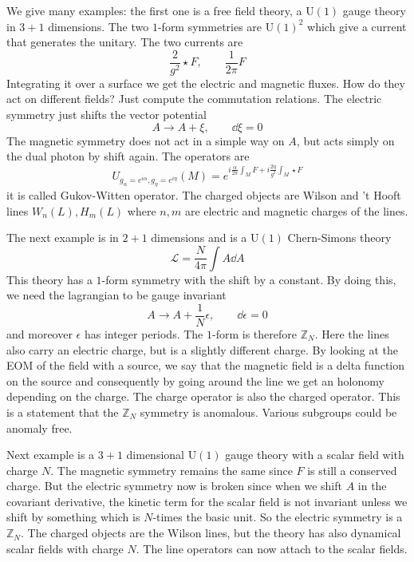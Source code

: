 \documentclass[11pt]{article}
\theoremstyle{definition}
\numberwithin{equation}{section}
\newcommand*\cL{\mathcal{L}}
\newcommand*\bbZ{\mathbb{Z}}
\newcommand*\U{\mathrm{U}}
\begin{document}
We give many examples: the first one is a free field theory, a $\U(1)$ gauge theory in $3+1$ dimensions. The two $1$-form symmetries are $\U(1)^{2}$ which give a current that generates the unitary. The two currents are 
\begin{equation}
	\frac{2}{g^{2}} \star F,\qquad \frac{1}{2\pi} F
\end{equation}
Integrating it over a surface we get the electric and magnetic fluxes. How do they act on different fields? Just compute the commutation relations. The electric symmetry just shifts the vector potential
\begin{equation}
	A\rightarrow A+\xi,\qquad \dd{\xi}=0
\end{equation}
The magnetic symmetry does not act in a simple way on $A$, but acts simply on the dual photon by shift again. The operators are
\begin{equation}
	U_{g_{\alpha}=e^{i\alpha},g_{\eta}=e^{i\eta}}(M)=e^{i\frac{\alpha}{2\pi}\int_{M}F+i\frac{2\eta}{g^{2}}\int_{M}\star F}
\end{equation}
it is called Gukov-Witten operator. The charged objects are Wilson and 't Hooft lines $W_{n}(L),H_{m}(L)$ where $n,m$ are electric and magnetic charges of the lines.

The next example is in $2+1$ dimensions and is a $\U(1)$ Chern-Simons theory
\begin{equation}
	\cL=\frac{N}{4\pi}\int A\dd{A}
\end{equation}
This theory has a $1$-form symmetry with the shift by a constant. By doing this, we need the lagrangian to be gauge invariant
\begin{equation}
	A\rightarrow A+\frac{1}{N}\epsilon,\qquad \dd{\epsilon}=0
\end{equation}
and moreover $\epsilon$ has integer periods. The $1$-form is therefore $\bbZ_{N}$. Here the lines also carry an electric charge, but is a slightly different charge. By looking at the EOM of the field with a source, we say that the magnetic field is a delta function on the source and consequently by going around the line we get an holonomy depending on the charge. The charge operator is also the charged operator. This is a statement that the $\bbZ_{N}$ symmetry is anomalous. Various subgroups could be anomaly free.

Next example is a $3+1$ dimensional $\U(1)$ gauge theory with a scalar field with charge $N$. The magnetic symmetry remains the same since $F$ is still a conserved charge. But the electric symmetry now is broken since when we shift $A$ in the covariant derivative, the kinetic term for the scalar field is not invariant unless we shift by something which is $N$-times the basic unit. So the electric symmetry is a $\bbZ_{N}$. The charged objects are the Wilson lines, but the theory has also dynamical scalar fields with charge $N$. The line operators can now attach to the scalar fields.
\end{document}
